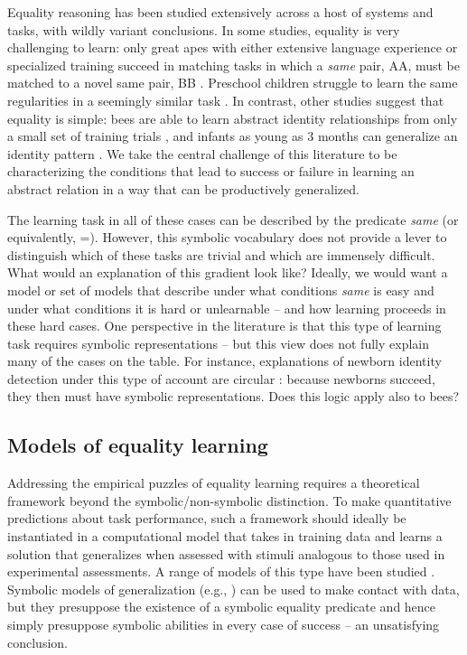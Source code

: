 \documentclass{article}
\begin{document}
Equality reasoning has been studied extensively across a host of systems and tasks, with wildly variant conclusions. In some studies, equality is very challenging to learn: only great apes with either extensive language experience or specialized training succeed in matching tasks in which a \emph{same} pair, AA, must be matched to a novel same pair, BB \citep{Premack:1983,thompson:2001}. Preschool children struggle to learn the same regularities in a seemingly similar task \citep{walker:2016}. In contrast, other studies suggest that equality is simple: bees are able to learn abstract identity relationships from only a small set of training trials \citep{avargues:2011}, and infants as young as 3 months can generalize an identity pattern \citep{anderson:2018}. We take the central challenge of this literature to be characterizing the conditions that lead to success or failure in learning an abstract relation in a way that can be productively generalized.

The learning task in all of these cases can be described by the predicate \emph{same} (or equivalently, =).  However, this symbolic vocabulary does not provide a lever to distinguish which of these tasks are trivial and which are immensely difficult. What would an explanation of this gradient look like? Ideally, we would want a model or set of models that describe under what conditions \emph{same} is easy and under what conditions it is hard or unlearnable -- and how learning proceeds in these hard cases. One perspective in the literature is that this type of learning task requires symbolic representations \citep{marcus:1999,Premack:1983} -- but this view does not fully explain many of the cases on the table. For instance, explanations of newborn identity detection under this type of account are circular \citep{gervain:2012}: because newborns succeed, they then must have symbolic representations. Does this logic apply also to bees?


\subsection{Models of equality learning}

Addressing the empirical puzzles of equality learning requires a theoretical framework beyond the symbolic/non-symbolic distinction. To make quantitative predictions about task performance, such a framework should ideally be instantiated in a computational model that takes in training data and learns a solution that generalizes when assessed with stimuli analogous to those used in experimental assessments. A range of models of this type have been studied \citep{alhama:2019}. Symbolic models of generalization (e.g., \citealt{frank:2011}) can be used to make contact with data, but they presuppose the existence of a symbolic equality predicate and hence simply presuppose symbolic abilities in every case of success -- an unsatisfying conclusion.
\end{document}
